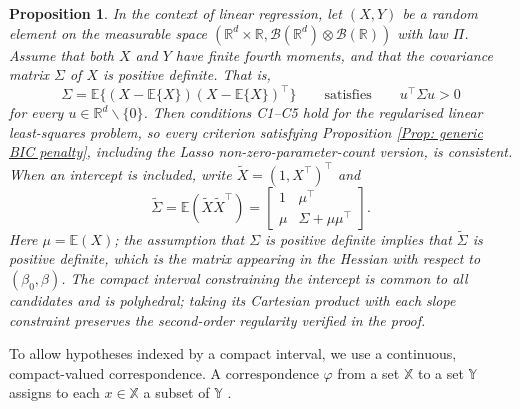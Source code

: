 \documentclass[12pt]{article}
\newtheorem{proposition}{Proposition}
\theoremstyle{remark}
\theoremstyle{plain}
\begin{document}
\begin{proposition}
    \label{Prop: BIC-like consistency}
    In the context of linear regression, let $(X, Y)$ be a random element on the measurable space $(\mathbb{R}^d \times \mathbb{R}, \mathcal{B}(\mathbb{R}^d)\otimes \mathcal{B}(\mathbb{R}))$ with law $\Pi$. Assume that both $X$ and $Y$ have finite fourth moments, and that the covariance matrix $\Sigma$ of $X$ is positive definite. That is,
    \[\Sigma = \mathbb{E}\{(X - \mathbb{E}\{X\})(X - \mathbb{E}\{X\})^\top\} \qquad \text{satisfies} \qquad u^\top \Sigma u > 0\]
    for every $u \in \mathbb{R}^d \backslash \{0\}$. Then conditions C1--C5 hold for the regularised linear least-squares problem, so every criterion satisfying Proposition \ref{Prop: generic BIC penalty}, including the Lasso non-zero-parameter-count version, is consistent. When an intercept is included, write $\tilde{X}=(1,X^\top)^\top$ and
    \[
    \tilde{\Sigma}=\mathbb{E}(\tilde{X}\tilde{X}^\top)=\begin{bmatrix}1 & \mu^\top\\ \mu & \Sigma+\mu\mu^\top\end{bmatrix}.
    \]
    Here $\mu=\mathbb{E}(X)$; the assumption that $\Sigma$ is positive definite implies that $\tilde{\Sigma}$ is positive definite, which is the matrix appearing in the Hessian with respect to $(\beta_0,\beta)$. The compact interval constraining the intercept is common to all candidates and is polyhedral; taking its Cartesian product with each slope constraint preserves the second-order regularity verified in the proof.
\end{proposition}

To allow hypotheses indexed by a compact interval, we use a continuous, compact-valued correspondence. A correspondence $\varphi$ from a set $\mathbb{X}$ to a set $\mathbb{Y}$ assigns to each $x\in\mathbb{X}$ a subset of $\mathbb{Y}$ \citep[Definition 17.1]{aliprantis_infinite_2006}.
\end{document}
